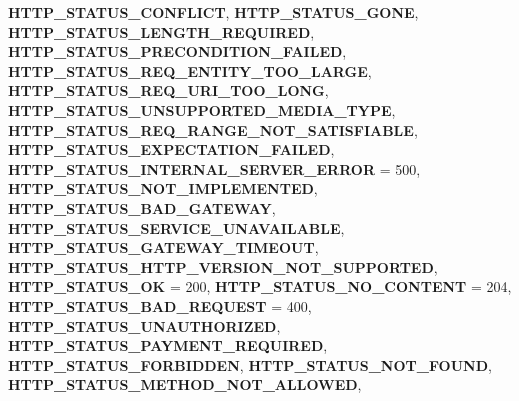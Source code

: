 \begin{DoxyCompactItemize}
{\bfseries H\+T\+T\+P\+\_\+\+S\+T\+A\+T\+U\+S\+\_\+\+C\+O\+N\+F\+L\+I\+CT}, 
{\bfseries H\+T\+T\+P\+\_\+\+S\+T\+A\+T\+U\+S\+\_\+\+G\+O\+NE}, 
{\bfseries H\+T\+T\+P\+\_\+\+S\+T\+A\+T\+U\+S\+\_\+\+L\+E\+N\+G\+T\+H\+\_\+\+R\+E\+Q\+U\+I\+R\+ED}, 
\newline
{\bfseries H\+T\+T\+P\+\_\+\+S\+T\+A\+T\+U\+S\+\_\+\+P\+R\+E\+C\+O\+N\+D\+I\+T\+I\+O\+N\+\_\+\+F\+A\+I\+L\+ED}, 
{\bfseries H\+T\+T\+P\+\_\+\+S\+T\+A\+T\+U\+S\+\_\+\+R\+E\+Q\+\_\+\+E\+N\+T\+I\+T\+Y\+\_\+\+T\+O\+O\+\_\+\+L\+A\+R\+GE}, 
{\bfseries H\+T\+T\+P\+\_\+\+S\+T\+A\+T\+U\+S\+\_\+\+R\+E\+Q\+\_\+\+U\+R\+I\+\_\+\+T\+O\+O\+\_\+\+L\+O\+NG}, 
{\bfseries H\+T\+T\+P\+\_\+\+S\+T\+A\+T\+U\+S\+\_\+\+U\+N\+S\+U\+P\+P\+O\+R\+T\+E\+D\+\_\+\+M\+E\+D\+I\+A\+\_\+\+T\+Y\+PE}, 
\newline
{\bfseries H\+T\+T\+P\+\_\+\+S\+T\+A\+T\+U\+S\+\_\+\+R\+E\+Q\+\_\+\+R\+A\+N\+G\+E\+\_\+\+N\+O\+T\+\_\+\+S\+A\+T\+I\+S\+F\+I\+A\+B\+LE}, 
{\bfseries H\+T\+T\+P\+\_\+\+S\+T\+A\+T\+U\+S\+\_\+\+E\+X\+P\+E\+C\+T\+A\+T\+I\+O\+N\+\_\+\+F\+A\+I\+L\+ED}, 
{\bfseries H\+T\+T\+P\+\_\+\+S\+T\+A\+T\+U\+S\+\_\+\+I\+N\+T\+E\+R\+N\+A\+L\+\_\+\+S\+E\+R\+V\+E\+R\+\_\+\+E\+R\+R\+OR} = 500, 
{\bfseries H\+T\+T\+P\+\_\+\+S\+T\+A\+T\+U\+S\+\_\+\+N\+O\+T\+\_\+\+I\+M\+P\+L\+E\+M\+E\+N\+T\+ED}, 
\newline
{\bfseries H\+T\+T\+P\+\_\+\+S\+T\+A\+T\+U\+S\+\_\+\+B\+A\+D\+\_\+\+G\+A\+T\+E\+W\+AY}, 
{\bfseries H\+T\+T\+P\+\_\+\+S\+T\+A\+T\+U\+S\+\_\+\+S\+E\+R\+V\+I\+C\+E\+\_\+\+U\+N\+A\+V\+A\+I\+L\+A\+B\+LE}, 
{\bfseries H\+T\+T\+P\+\_\+\+S\+T\+A\+T\+U\+S\+\_\+\+G\+A\+T\+E\+W\+A\+Y\+\_\+\+T\+I\+M\+E\+O\+UT}, 
{\bfseries H\+T\+T\+P\+\_\+\+S\+T\+A\+T\+U\+S\+\_\+\+H\+T\+T\+P\+\_\+\+V\+E\+R\+S\+I\+O\+N\+\_\+\+N\+O\+T\+\_\+\+S\+U\+P\+P\+O\+R\+T\+ED}, 
\newline
{\bfseries H\+T\+T\+P\+\_\+\+S\+T\+A\+T\+U\+S\+\_\+\+OK} = 200, 
{\bfseries H\+T\+T\+P\+\_\+\+S\+T\+A\+T\+U\+S\+\_\+\+N\+O\+\_\+\+C\+O\+N\+T\+E\+NT} = 204, 
{\bfseries H\+T\+T\+P\+\_\+\+S\+T\+A\+T\+U\+S\+\_\+\+B\+A\+D\+\_\+\+R\+E\+Q\+U\+E\+ST} = 400, 
{\bfseries H\+T\+T\+P\+\_\+\+S\+T\+A\+T\+U\+S\+\_\+\+U\+N\+A\+U\+T\+H\+O\+R\+I\+Z\+ED}, 
\newline
{\bfseries H\+T\+T\+P\+\_\+\+S\+T\+A\+T\+U\+S\+\_\+\+P\+A\+Y\+M\+E\+N\+T\+\_\+\+R\+E\+Q\+U\+I\+R\+ED}, 
{\bfseries H\+T\+T\+P\+\_\+\+S\+T\+A\+T\+U\+S\+\_\+\+F\+O\+R\+B\+I\+D\+D\+EN}, 
{\bfseries H\+T\+T\+P\+\_\+\+S\+T\+A\+T\+U\+S\+\_\+\+N\+O\+T\+\_\+\+F\+O\+U\+ND}, 
{\bfseries H\+T\+T\+P\+\_\+\+S\+T\+A\+T\+U\+S\+\_\+\+M\+E\+T\+H\+O\+D\+\_\+\+N\+O\+T\+\_\+\+A\+L\+L\+O\+W\+ED}, 
\newline

\end{DoxyCompactItemize}
